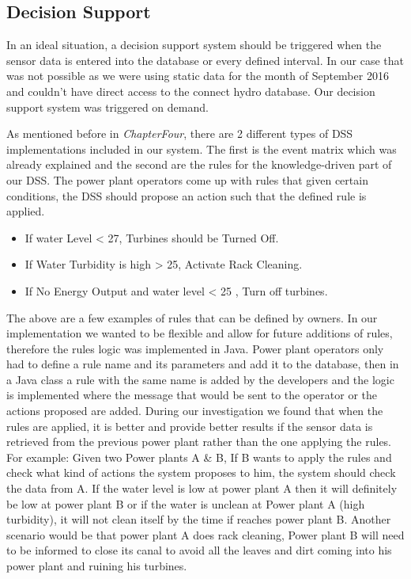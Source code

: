 \subsection{Decision Support}
\label{subsec:DecisionSuport}
In an ideal situation, a decision support system should be triggered when the sensor data is entered into the database or every defined interval. In our case that was not possible as we were using static data for the month of September 2016 and couldn't have direct access to the connect hydro database. Our decision support system was triggered on demand. 

As mentioned before in \textit{ChapterFour}, there are 2 different types of DSS implementations included in our system. The first is the event matrix which was already explained and the second are the rules for the knowledge-driven part of our DSS. The power plant operators come up with rules that given certain conditions, the DSS should propose an action such that the defined rule is applied.
\begin{itemize}
	\item If water Level < 27, Turbines should be Turned Off.
	\item If Water Turbidity is high > 25, Activate Rack Cleaning.
	\item If No Energy Output and water level < 25 , Turn off turbines.
\end{itemize}
The above are a few examples of rules that can be defined by owners. In our implementation we wanted to be flexible and allow for future additions of rules, therefore the rules logic was implemented in Java. Power plant operators only had to define a rule name and its parameters and add it to the database, then in a Java class a rule with the same name is added by the developers and the logic is implemented where the message that would be sent to the operator or the actions proposed are added. During our investigation we found that when the rules are applied, it is better and provide better results if the sensor data is retrieved from the previous power plant rather than the one applying the rules. For example: Given two Power plants A \& B, If B wants to apply the rules and check what kind of actions the system proposes to him, the system should check the data from A. If the water level is low at power plant A then it will definitely be low at power plant B or if the water is unclean at Power plant A (high turbidity), it will not clean itself by the time if reaches power plant B. Another scenario would be that power plant A does rack cleaning, Power plant B will need to be informed to close its canal to avoid all the leaves and dirt coming into his power plant and ruining his turbines.

